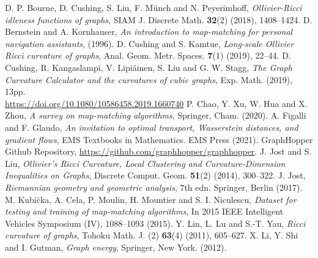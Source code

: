 \documentclass{article}
\numberwithin{equation}{section}
\theoremstyle{definition}
\begin{document}
\begin{small}

%  
\begin{thebibliography}{YCWXCLMD}
 D. P. Bourne, D. Cushing, S. Liu, F. M\"{u}nch and N. Peyerimhoff, \textit{Ollivier-Ricci idleness functions of graphs}, SIAM J. Discrete Math. \textbf{32}(2) (2018), 1408--1424.
  D. Bernstein and A. Kornhauser, \textit{An introduction to map-matching for personal navigation assistants}, (1996).
 D. Cushing and S. Kamtue, \textit{Long-scale Ollivier Ricci curvature of graphs}, Anal. Geom. Metr. Spaces. \textbf{7}(1) (2019), 22--44. 
 D. Cushing, R. Kangaslampi, V. Lipi\"{a}inen, S. Liu and G. W. Stagg, \textit{The Graph Curvature Calculator and the curvatures of cubic graphs}, Exp. Math. (2019), 13pp. \\
\url{https://doi.org/10.1080/10586458.2019.1660740}
 P. Chao,  Y. Xu,  W. Hua and X. Zhou, \textit{A survey on map-matching algorithms}, Springer, Cham. (2020).
 A. Figalli and F. Glaudo, \textit{An invitation to optimal transport, Wasserstein distances, and gradient flows}, EMS Textbooks in Mathematics. EMS Press (2021).
 GraphHopper Github Repository, \url{https://github.com/graphhopper/graphhopper}.
 J. Jost and S. Liu, \textit{Ollivier's Ricci Curvature, Local Clustering and Curvature-Dimension Inequalities on Graphs},  Discrete Comput. Geom. \textbf{51}(2) (2014), 300--322.
 J. Jost, \textit{Riemannian geometry and geometric analysis}, $7$th edn. Springer, Berlin (2017).
 M. Kubi\u cka, A. Cela, P. Moulin, H. Mountier and S. I. Niculescu, \textit{Dataset for testing and training of map-matching algorithms}, In 2015 IEEE Intelligent Vehicles Symposium (IV), 1088--1093 (2015).
 Y. Lin, L. Lu and S.-T. Yau, \textit{Ricci curvature of graphs}, Tohoku Math. J. (2) \textbf{63}(4) (2011), 605--627.
 X. Li, Y. Shi and I. Gutman, \textit{Graph energy}, Springer, New York. (2012).

\end{thebibliography}
\end{small}
\end{document}

